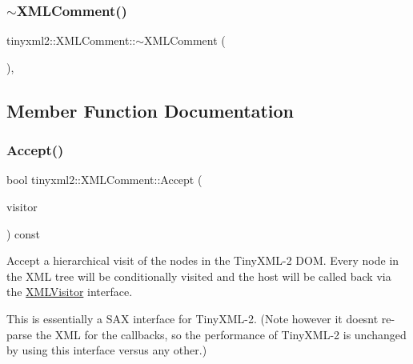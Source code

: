 \mbox{\label{classtinyxml2_1_1_x_m_l_comment_ab592f69b47852455c1b32c5e31e453d0}} 
\subsubsection{\texorpdfstring{$\sim$\+X\+M\+L\+Comment()}{~XMLComment()}}
{\footnotesize\ttfamily tinyxml2\+::\+X\+M\+L\+Comment\+::$\sim$\+X\+M\+L\+Comment (\begin{DoxyParamCaption}{ }\end{DoxyParamCaption})\hspace{0.3cm}{\ttfamily [protected]}, {\ttfamily [virtual]}}



\subsection{Member Function Documentation}
\mbox{\label{classtinyxml2_1_1_x_m_l_comment_a27b37d16cea01b5329dfbbb4f9508e39}} 
\subsubsection{\texorpdfstring{Accept()}{Accept()}}
{\footnotesize\ttfamily bool tinyxml2\+::\+X\+M\+L\+Comment\+::\+Accept (\begin{DoxyParamCaption}\item[{\hyperlink{classtinyxml2_1_1_x_m_l_visitor}{X\+M\+L\+Visitor} $\ast$}]{visitor }\end{DoxyParamCaption}) const\hspace{0.3cm}{\ttfamily [virtual]}}

Accept a hierarchical visit of the nodes in the Tiny\+X\+M\+L-\/2 D\+OM. Every node in the X\+ML tree will be conditionally visited and the host will be called back via the \hyperlink{classtinyxml2_1_1_x_m_l_visitor}{X\+M\+L\+Visitor} interface.

This is essentially a S\+AX interface for Tiny\+X\+M\+L-\/2. (Note however it doesn\textquotesingle{}t re-\/parse the X\+ML for the callbacks, so the performance of Tiny\+X\+M\+L-\/2 is unchanged by using this interface versus any other.)

